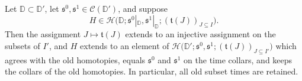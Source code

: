 \begin{theorem}
\label{thm:relative-homotopy-lifting}
Let $\mathbb D\subset\mathbb D'$, let
$\mathfrak s^0,\mathfrak s^1\in\mathcal C(\mathbb D')$, and suppose
\[
 H\in\mathcal H\bigl(
 \mathbb D;\mathfrak s^0|_{\mathbb D},\mathfrak s^1|_{\mathbb D};
 (\mathfrak t(J))_{J\subseteq I}\bigr).
\]
Then the assignment $J\mapsto\mathfrak t(J)$ extends to an injective assignment
on the subsets of $I'$, and $H$ extends to an element of
$\mathcal H\bigl(\mathbb D';\mathfrak s^0,\mathfrak s^1;
(\mathfrak t(J))_{J\subseteq I'}\bigr)$ which agrees with the old homotopies,
equals $\mathfrak s^0$ and $\mathfrak s^1$ on the time collars, and keeps the
collars of the old homotopies.  In particular, all old subset times are
retained.
\end{theorem}

